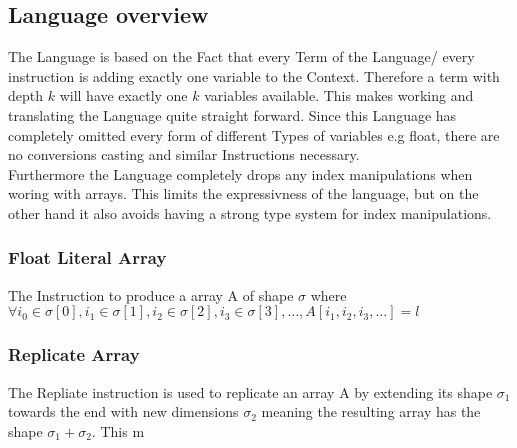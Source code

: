 \subsection{Language overview}
The Language is based on the Fact that every Term of the Language/ every instruction is adding exactly one variable to the Context.
Therefore a term with depth $k$ will have exactly one $k$ variables available.
This makes working and translating the Language quite straight forward.
Since this Language has completely omitted every form of different Types of variables e.g float, there are no conversions casting and similar Instructions necessary.\\
Furthermore the Language completely drops any index manipulations when woring with arrays.
This limits the expressivness of the language, but on the other hand it also avoids having a strong type system for index manipulations.

\subsubsection{Float Literal Array}
The Instruction to produce a array A of shape $\sigma$ where $\forall i_0 \in \sigma[0], i_1 \in \sigma[1], i_2\in \sigma[2], i_3\in \sigma[3], \dots, A[i_1, i_2, i_3, \dots] = l$

\subsubsection{Replicate Array}
The Repliate instruction is used to replicate an array A by extending its shape $\sigma_1$ towards the end with new dimensions $\sigma_2$
meaning the resulting array has the shape $\sigma_1+\sigma_2$.
This m




